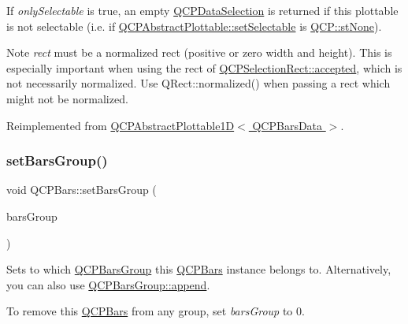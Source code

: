 If {\itshape only\+Selectable} is true, an empty \hyperlink{classQCPDataSelection}{Q\+C\+P\+Data\+Selection} is returned if this plottable is not selectable (i.\+e. if \hyperlink{classQCPAbstractPlottable_ac238d6e910f976f1f30d41c2bca44ac3}{Q\+C\+P\+Abstract\+Plottable\+::set\+Selectable} is \hyperlink{namespaceQCP_ac6cb9db26a564b27feda362a438db038aa64628e338a2dd1e6f0dc84dec0b63fe}{Q\+C\+P\+::st\+None}).

\begin{DoxyNote}{Note}
{\itshape rect} must be a normalized rect (positive or zero width and height). This is especially important when using the rect of \hyperlink{classQCPSelectionRect_a15a43542e1f7b953a44c260b419e6d2c}{Q\+C\+P\+Selection\+Rect\+::accepted}, which is not necessarily normalized. Use {\ttfamily Q\+Rect\+::normalized()} when passing a rect which might not be normalized. 
\end{DoxyNote}


Reimplemented from \hyperlink{classQCPAbstractPlottable1D_a22377bf6e57ab7eedbc9e489250c6ded}{Q\+C\+P\+Abstract\+Plottable1\+D$<$ Q\+C\+P\+Bars\+Data $>$}.

\mbox{\label{classQCPBars_aedd1709061f0b307c47ddb45e172ef9a}} 
\subsubsection{\texorpdfstring{set\+Bars\+Group()}{setBarsGroup()}}
{\footnotesize\ttfamily void Q\+C\+P\+Bars\+::set\+Bars\+Group (\begin{DoxyParamCaption}\item[{\hyperlink{classQCPBarsGroup}{Q\+C\+P\+Bars\+Group} $\ast$}]{bars\+Group }\end{DoxyParamCaption})}

Sets to which \hyperlink{classQCPBarsGroup}{Q\+C\+P\+Bars\+Group} this \hyperlink{classQCPBars}{Q\+C\+P\+Bars} instance belongs to. Alternatively, you can also use \hyperlink{classQCPBarsGroup_a809ed63cc4ff7cd5b0b8c96b470163d3}{Q\+C\+P\+Bars\+Group\+::append}.

To remove this \hyperlink{classQCPBars}{Q\+C\+P\+Bars} from any group, set {\itshape bars\+Group} to 0. \mbox{\label{classQCPBars_a574ec7eb7537566df1a28ff085d75623}} 
